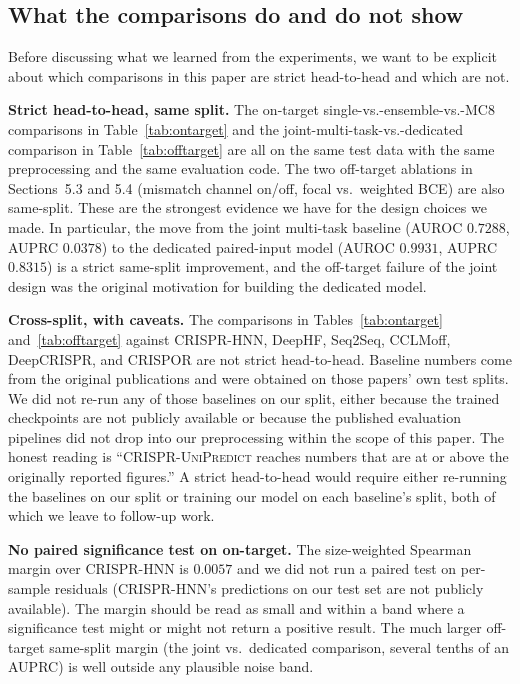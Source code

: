 \documentclass[11pt,a4paper]{article}
\begin{document}
\subsection{What the comparisons do and do not show}

Before discussing what we learned from the experiments, we want to be explicit about which comparisons in this paper are strict head-to-head and which are not.

\textbf{Strict head-to-head, same split.} The on-target single-vs.-ensemble-vs.-MC8 comparisons in Table~\ref{tab:ontarget} and the joint-multi-task-vs.-dedicated comparison in Table~\ref{tab:offtarget} are all on the same test data with the same preprocessing and the same evaluation code. The two off-target ablations in Sections~5.3 and 5.4 (mismatch channel on/off, focal vs.\ weighted BCE) are also same-split. These are the strongest evidence we have for the design choices we made. In particular, the move from the joint multi-task baseline (AUROC $0.7288$, AUPRC $0.0378$) to the dedicated paired-input model (AUROC $0.9931$, AUPRC $0.8315$) is a strict same-split improvement, and the off-target failure of the joint design was the original motivation for building the dedicated model.

\textbf{Cross-split, with caveats.} The comparisons in Tables~\ref{tab:ontarget} and~\ref{tab:offtarget} against CRISPR-HNN, DeepHF, Seq2Seq, CCLMoff, DeepCRISPR, and CRISPOR are not strict head-to-head. Baseline numbers come from the original publications and were obtained on those papers' own test splits. We did not re-run any of those baselines on our split, either because the trained checkpoints are not publicly available or because the published evaluation pipelines did not drop into our preprocessing within the scope of this paper. The honest reading is ``\textsc{CRISPR-UniPredict} reaches numbers that are at or above the originally reported figures.'' A strict head-to-head would require either re-running the baselines on our split or training our model on each baseline's split, both of which we leave to follow-up work.

\textbf{No paired significance test on on-target.} The size-weighted Spearman margin over CRISPR-HNN is $0.0057$ and we did not run a paired test on per-sample residuals (CRISPR-HNN's predictions on our test set are not publicly available). The margin should be read as small and within a band where a significance test might or might not return a positive result. The much larger off-target same-split margin (the joint vs.\ dedicated comparison, several tenths of an AUPRC) is well outside any plausible noise band.
\end{document}
